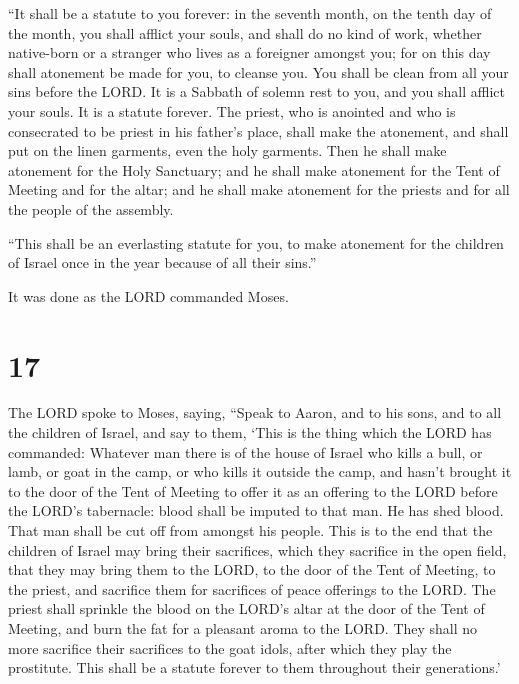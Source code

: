  ``It shall be a statute to you forever: in the seventh
month, on the tenth day of the month, you shall afflict your souls, and
shall do no kind of work, whether native-born or a stranger who lives as
a foreigner amongst you;  for on this day shall atonement
be made for you, to cleanse you. You shall be clean from all your sins
before the LORD.  It is a Sabbath of solemn rest to you,
and you shall afflict your souls. It is a statute forever.
 The priest, who is anointed and who is consecrated to be
priest in his father's place, shall make the atonement, and shall put on
the linen garments, even the holy garments.  Then he
shall make atonement for the Holy Sanctuary; and he shall make atonement
for the Tent of Meeting and for the altar; and he shall make atonement
for the priests and for all the people of the assembly.

 ``This shall be an everlasting statute for you, to make
atonement for the children of Israel once in the year because of all
their sins.''

It was done as the LORD commanded Moses.

\hypertarget{section-16}{%
\section{17}\label{section-16}}

 The LORD spoke to Moses, saying,  ``Speak
to Aaron, and to his sons, and to all the children of Israel, and say to
them, `This is the thing which the LORD has commanded: 
Whatever man there is of the house of Israel who kills a bull, or lamb,
or goat in the camp, or who kills it outside the camp, 
and hasn't brought it to the door of the Tent of Meeting to offer it as
an offering to the LORD before the LORD's tabernacle: blood shall be
imputed to that man. He has shed blood. That man shall be cut off from
amongst his people.  This is to the end that the children
of Israel may bring their sacrifices, which they sacrifice in the open
field, that they may bring them to the LORD, to the door of the Tent of
Meeting, to the priest, and sacrifice them for sacrifices of peace
offerings to the LORD.  The priest shall sprinkle the
blood on the LORD's altar at the door of the Tent of Meeting, and burn
the fat for a pleasant aroma to the LORD.  They shall no
more sacrifice their sacrifices to the goat idols, after which they play
the prostitute. This shall be a statute forever to them throughout their
generations.'

